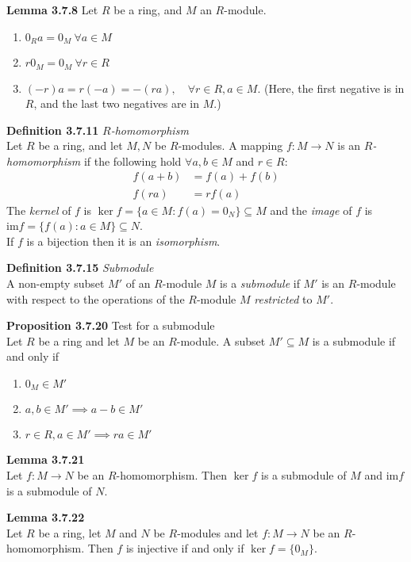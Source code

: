 \documentclass[8pt,landscape]{article}
\begin{document}
\begin{multicols}{3}
    \textbf{Lemma 3.7.8} Let $R$ be a ring, and $M$ an $R$-module.
    \begin{enumerate}
        \item ${0_R}a = 0_M \ \forall a \in M$
        \item $r{0_M} = 0_M \ \forall r \in R$
        \item $(-r)a = r(-a) = -(ra), \quad \forall r \in R, a \in M$.
            (Here, the first negative is in $R$, and the last two negatives are in $M$.)
    \end{enumerate}

    \textbf{Definition 3.7.11} \emph{$R$-homomorphism} \\
    Let $R$ be a ring, and let $M,N$ be $R$-modules.
    A mapping $f : M \to N$ is an \emph{$R$-homomorphism} if the following hold
    $\forall a,b \in M$ and $r \in R$:
    \begin{align*}{}
        f(a+b) & = f(a) + f(b) \\
        f(ra)  & = rf(a)
    \end{align*}
    The \emph{kernel} of $f$ is $\ker f = \{a\in M : f(a) = 0_N \} \subseteq M$
    and the \emph{image} of $f$ is $\mathrm{im} f = \{f(a) : a \in M\} \subseteq N$. \\
    If $f$ is a bijection then it is an \emph{isomorphism}.

    \textbf{Definition 3.7.15} \emph{Submodule} \\
    A non-empty subset $M'$ of an $R$-module $M$ is a \emph{submodule} if $M'$ is an
    $R$-module with respect to the operations of the $R$-module $M$ \emph{restricted} to
    $M'$.

    \textbf{Proposition 3.7.20} Test for a submodule \\
    Let $R$ be a ring and let $M$ be an $R$-module.
    A subset $M' \subseteq M$ is a submodule if and only if
    \begin{enumerate}
        \item $0_M \in M'$
        \item $a,b \in M' \implies a-b \in M'$
        \item $r \in R, a \in M' \implies ra \in M'$
    \end{enumerate}

    \textbf{Lemma 3.7.21} \\
    Let $f : M \to N$ be an $R$-homomorphism.
    Then $\ker f$ is a submodule of $M$ and $\mathrm{im} f$ is a submodule of $N$.

    \textbf{Lemma 3.7.22} \\
    Let $R$ be a ring, let $M$ and $N$ be $R$-modules and let $f : M \to N$ be an
    $R$-homomorphism.
    Then $f$ is injective if and only if $\ker f = \{0_M\}$.


\end{multicols}
\end{document}
